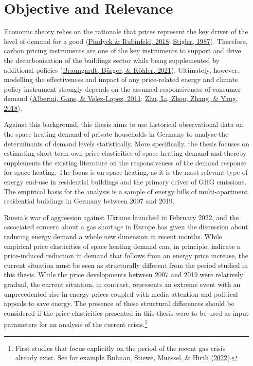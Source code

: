 \documentclass[12pt,twoside]{reedthesis}
\begin{document}
\hypertarget{relevance}{%
\section{Objective and Relevance}\label{relevance}}

Economic theory relies on the rationale that prices represent the key driver of the level of demand for a good (\protect\hyperlink{ref-pindyck_rubinfeld18}{Pindyck \& Rubinfeld, 2018}; \protect\hyperlink{ref-stigler87}{Stigler, 1987}). Therefore, carbon pricing instruments are one of the key instruments to support and drive the decarbonisation of the buildings sector while being supplemented by additional policies (\protect\hyperlink{ref-braungardt_etal21}{Braungardt, Bürger, \& Köhler, 2021}). Ultimately, however, modelling the effectiveness and impact of any price-related energy and climate policy instrument strongly depends on the assumed responsiveness of consumer demand (\protect\hyperlink{ref-alberini_etal11}{Alberini, Gans, \& Velez-Lopez, 2011}; \protect\hyperlink{ref-zhu_etal18}{Zhu, Li, Zhou, Zhang, \& Yang, 2018}).

Against this background, this thesis aims to use historical observational data on the space heating demand of private households in Germany to analyse the determinants of demand levels statistically. More specifically, the thesis focuses on estimating short-term own-price elasticities of space heating demand and thereby supplements the existing literature on the responsiveness of the demand response for space heating. The focus is on space heating, as it is the most relevant type of energy end-use in residential buildings and the primary driver of GHG emissions. The empirical basis for the analysis is a sample of energy bills of multi-apartment residential buildings in Germany between 2007 and 2019.

Russia's war of aggression against Ukraine launched in February 2022, and the associated concern about a gas shortage in Europe has given the discussion about reducing energy demand a whole new dimension in recent months. While empirical price elasticities of space heating demand can, in principle, indicate a price-induced reduction in demand that follows from an energy price increase, the current situation must be seen as structurally different from the period studied in this thesis. While the price developments between 2007 and 2019 were relatively gradual, the current situation, in contrast, represents an extreme event with an unprecedented rise in energy prices coupled with media attention and political appeals to save energy. The presence of these structural differences should be considered if the price elasticities presented in this thesis were to be used as input parameters for an analysis of the current crisis.\footnote{First studies that focus explicitly on the period of the recent gas crisis already exist. See for example Ruhnau, Stiewe, Muessel, \& Hirth (\protect\hyperlink{ref-Ruhnau2022demand}{2022}).}
\end{document}
